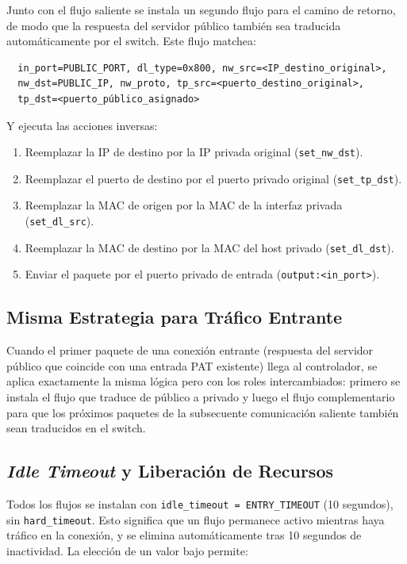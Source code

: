 \documentclass[11pt, a4paper]{article}
\begin{document}
Junto con el flujo saliente se instala un segundo flujo para el camino de retorno, de modo que la respuesta del servidor público también sea traducida automáticamente por el switch. Este flujo matchea:

\begin{verbatim}
  in_port=PUBLIC_PORT, dl_type=0x800, nw_src=<IP_destino_original>,
  nw_dst=PUBLIC_IP, nw_proto, tp_src=<puerto_destino_original>,
  tp_dst=<puerto_público_asignado>
\end{verbatim}

Y ejecuta las acciones inversas:

\begin{enumerate}
    \item Reemplazar la IP de destino por la IP privada original (\texttt{set\_nw\_dst}).
    \item Reemplazar el puerto de destino por el puerto privado original (\texttt{set\_tp\_dst}).
    \item Reemplazar la MAC de origen por la MAC de la interfaz privada (\texttt{set\_dl\_src}).
    \item Reemplazar la MAC de destino por la MAC del host privado (\texttt{set\_dl\_dst}).
    \item Enviar el paquete por el puerto privado de entrada (\texttt{output:<in\_port>}).
\end{enumerate}

\subsection{Misma Estrategia para Tráfico Entrante}
\label{subsec:flow_in_reverse}

Cuando el primer paquete de una conexión entrante (respuesta del servidor público que coincide con una entrada PAT existente) llega al controlador, se aplica exactamente la misma lógica pero con los roles intercambiados: primero se instala el flujo que traduce de público a privado y luego el flujo complementario para que los próximos paquetes de la subsecuente comunicación saliente también sean traducidos en el switch.

\subsection{\textit{Idle Timeout} y Liberación de Recursos}
\label{subsec:timeout}

Todos los flujos se instalan con \texttt{idle\_timeout = ENTRY\_TIMEOUT} (10 segundos), sin \texttt{hard\_timeout}. Esto significa que un flujo permanece activo mientras haya tráfico en la conexión, y se elimina automáticamente tras 10 segundos de inactividad. La elección de un valor bajo permite:
\end{document}
